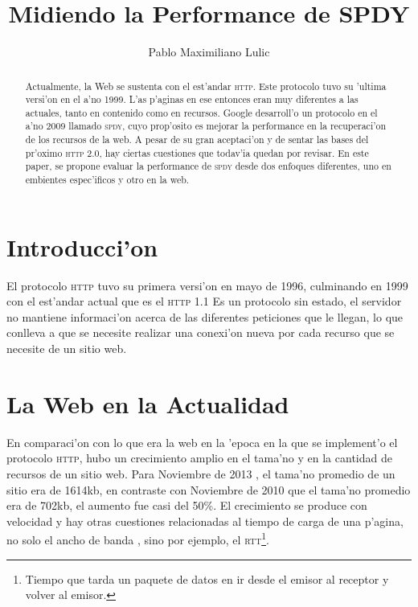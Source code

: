 \documentclass[a4paper,11pt,twocolumns]{article}
\begin{document}
\twocolumn

\title{Midiendo la Performance de SPDY}
\author{Pablo Maximiliano Lulic}

\maketitle

\begin{abstract} 
Actualmente, la Web se sustenta con el est'andar \textsc{http}. Este protocolo tuvo su 'ultima versi'on en el a'no 1999. L'as p'aginas en ese entonces eran muy diferentes a las actuales, tanto en contenido como en recursos. Google desarroll'o un protocolo en el a'no 2009 llamado \textsc{spdy}, cuyo prop'osito es mejorar la performance en la recuperaci'on de los recursos de la web. A pesar de su gran aceptaci'on y de sentar las bases del pr'oximo \textsc{http 2.0}, hay ciertas cuestiones que todav'ia quedan por revisar. En este paper, se propone evaluar la performance de \textsc{spdy} desde dos enfoques diferentes, uno en embientes espec'ificos y otro en la web.
\end{abstract}

\section{Introducci'on}

El protocolo \textsc{http} tuvo su primera versi'on en mayo de 1996, culminando en 1999 con el est'andar actual que es el \textsc{http}  1.1 \cite{rfcHTTP} Es un protocolo sin estado, el servidor no mantiene informaci'on acerca de las diferentes peticiones que le llegan, lo que conlleva a que se necesite realizar una conexi'on nueva por cada recurso que se necesite de un sitio web.

\section{La Web en la Actualidad}

En comparaci'on con lo que era la web en la 'epoca en la que se implement'o el protocolo \textsc{http}, hubo un crecimiento amplio en el tama'no y en la cantidad de recursos de un sitio web. Para Noviembre de 2013 \cite{httpArchive}, el tama'no promedio de un sitio era de 1614kb, en contraste con Noviembre de 2010 que el tama'no promedio era de 702kb, el aumento fue casi del 50\%. El crecimiento se produce con velocidad \cite{averageWebPage} y hay otras cuestiones relacionadas al tiempo de carga de una p'agina, no solo el ancho de banda \cite{moreBand}, sino por ejemplo, el \textsc{rtt}\footnote{Tiempo que tarda un paquete de datos en ir desde el emisor al receptor y volver al emisor.}.
\end{document}
